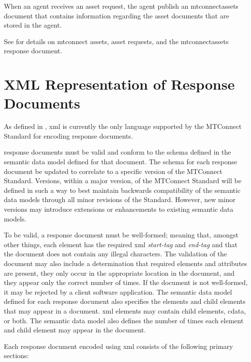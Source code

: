 \documentclass{mtconnect}	%
\begin{document}
When an \gls{agent} receives an \gls{asset request}, the \gls{agent} \MUST publish an \gls{mtconnectassets} document that contains information regarding the \glspl{asset document} that are stored in the \gls{agent}.

See  for details on \glspl{mtconnect asset}, \glspl{asset request}, and the \gls{mtconnectassets response document}.

\section{XML Representation of Response Documents}
\label{sec:XML Representation of Response Documents}

As defined in , \gls{xml} is currently the only language supported by the MTConnect Standard for encoding \glspl{response document}.

\glspl{response document} must be valid and conform to the \gls{schema} defined in the \gls{semantic data model} defined for that document.  The \gls{schema} for each \gls{response document} \MUST be updated to correlate to a specific version of the MTConnect Standard.  Versions, within a \gls{major} version, of the MTConnect Standard will be defined in such a way to best maintain backwards compatibility of the \glspl{semantic data model} through all \gls{minor} revisions of the Standard.  However, new \gls{minor} versions may introduce extensions or enhancements to existing \glspl{semantic data model}.

To be valid, a \gls{response document} must be well-formed; meaning that, amongst other things, each element has the required \gls{xml} \textit{start-tag} and \textit{end-tag} and that the document does not contain any illegal characters.  The validation of the document may also include a determination that required elements and attributes are present, they only occur in the appropriate location in the document, and they appear only the correct number of times.  If the document is not well-formed, it may be rejected by a client software application.  The \gls{semantic data model} defined for each \gls{response document} also specifies the elements and \glspl{child element} that may appear in a document.  \gls{xml} elements may contain \glspl{child element}, \gls{cdata}, or both.  The \gls{semantic data model} also defines the number of times each element and \gls{child element} may appear in the document.

Each \gls{response document} encoded using \gls{xml} consists of the following primary sections:
\end{document}
